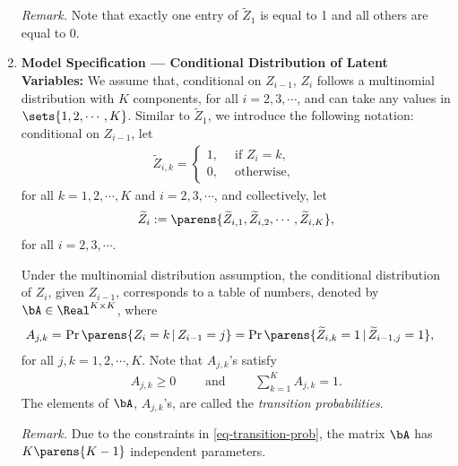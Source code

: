 \documentclass[12pt]{article}
\begin{document}
\begin{enumerate}[label=\textbf{\arabic*.}]
	\textit{Remark.} Note that exactly one entry of $\widetilde{Z}_1$ is equal to 1 and all others are equal to 0. 
	
	\item \textbf{Model Specification --- Conditional Distribution of Latent Variables:} We assume that, conditional on $Z_{i-1}$, $Z_i$ follows a multinomial distribution with $K$ components, for all $i = 2, 3, \cdots$, and can take any values in $\sets{1, 2, \cdots, K}$. Similar to $\widetilde{Z}_1$, we introduce the following notation: conditional on $Z_{i-1}$, let 
	\begin{align*}
		\widetilde{Z}_{i,k} = \begin{cases}
			1, & \, \text{ if } Z_i = k, \\ 
			0, & \, \text{ otherwise}, 
		\end{cases} \qquad 
	\end{align*}
	for all $k = 1, 2, \cdots, K$ and $i = 2, 3, \cdots$, and collectively, let 
	\begin{align*}
		\widetilde{Z}_i := \parens{\widetilde{Z}_{i,1}, \widetilde{Z}_{i,2}, \cdots, \widetilde{Z}_{i,K}}, 
	\end{align*}
	for all $i = 2, 3, \cdots$. 
	
	Under the multinomial distribution assumption, the conditional distribution of $Z_i$, given $Z_{i-1}$, corresponds to a table of numbers, denoted by $\bA \in \Real^{K \times K}$, where 
	\begin{align*}
		A_{j, k} = & \, \Pr \parens{Z_{i} = k \,\vert\, Z_{i-1} = j} 
		= \Pr \parens{\widetilde{Z}_{i,k} = 1 \,\vert\, \widetilde{Z}_{i-1,j} = 1}, 
	\end{align*}
	for all $j, k = 1, 2, \cdots, K$. Note that $A_{j,k}$'s satisfy 
	\begin{align}\label{eq-transition-prob}
		A_{j,k} \ge 0 \qquad \text{ and } \qquad \sum_{k=1}^K A_{j,k} = 1. 
	\end{align}
	The elements of $\bA$, $A_{j,k}$'s, are called the \emph{transition probabilities}. 
	
	
	\textit{Remark.} Due to the constraints in \eqref{eq-transition-prob}, the matrix $\bA$ has $K \parens{K-1}$ independent parameters. 
	

\end{enumerate}
\end{document}

